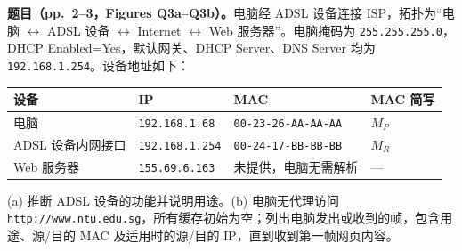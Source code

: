 \textbf{题目（pp.~2--3，Figures Q3a--Q3b）。}电脑经 ADSL 设备连接 ISP，拓扑为“电脑 $\leftrightarrow$ ADSL 设备 $\leftrightarrow$ Internet $\leftrightarrow$ Web 服务器”。电脑掩码为 \texttt{255.255.255.0}，DHCP Enabled=Yes，默认网关、DHCP Server、DNS Server 均为 \texttt{192.168.1.254}。设备地址如下：
\begin{center}
\small
\begin{tabular}{@{}llll@{}}
\toprule
设备 & IP & MAC & MAC 简写 \\
\midrule
电脑 & \texttt{192.168.1.68} & \texttt{00-23-26-AA-AA-AA} & $M_P$ \\
ADSL 设备内网接口 & \texttt{192.168.1.254} & \texttt{00-24-17-BB-BB-BB} & $M_R$ \\
Web 服务器 & \texttt{155.69.6.163} & 未提供，电脑无需解析 & --- \\
\bottomrule
\end{tabular}
\end{center}
(a) 推断 ADSL 设备的功能并说明用途。(b) 电脑无代理访问 \texttt{http://www.ntu.edu.sg}，所有缓存初始为空；列出电脑发出或收到的帧，包含用途、源/目的 MAC 及适用时的源/目的 IP，直到收到第一帧网页内容。

